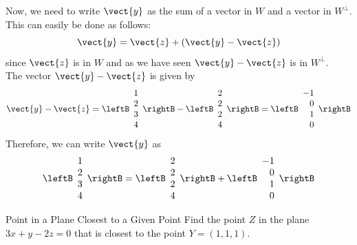 \begin{solution}
Now, we need to write $\vect{y}$ as the sum of a vector in $W$ and a
vector in $W^{\perp}$. This can easily be done as follows:
\[
\vect{y} = \vect{z} + (\vect{y} - \vect{z})
\]
since $\vect{z}$ is in $W$ and as we have seen $\vect{y} - \vect{z}$ is in  $W^{\perp}$. \\
The vector $\vect{y} - \vect{z}$ is given by 
\[
\vect{y} - \vect{z} = \leftB
\begin{array}{c}
1 \\
2 \\
3 \\
4 
\end{array}
\rightB
-
\leftB
\begin{array}{c}
2 \\
2 \\
2 \\
4 
\end{array}
\rightB
 = 
\leftB
\begin{array}{r}
-1 \\
0 \\
1 \\
0
\end{array}
\rightB
\]
Therefore, we can write $\vect{y}$ as
\[
\leftB
\begin{array}{c}
1 \\
2 \\
3 \\
4 
\end{array}
\rightB
=
\leftB
\begin{array}{c}
2 \\
2 \\
2 \\
4 
\end{array}
\rightB
+
\leftB
\begin{array}{r}
-1 \\
0 \\
1 \\
0
\end{array}
\rightB
\]
\end{solution}

\begin{example}{Point in a Plane Closest to a Given Point}\label{exa:closestplane}
Find the point $Z$ in the plane $3x+y-2z=0$ that is closest to
the point $Y=(1,1,1)$.
\end{example}

